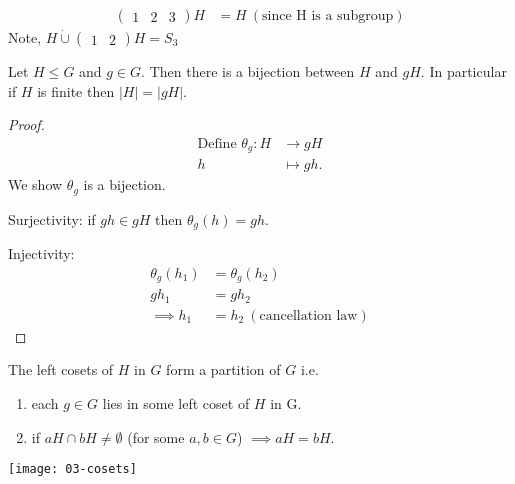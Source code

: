 \begin{example}
\begin{align*}
    \begin{pmatrix}1 & 2 & 3\end{pmatrix}H &= H \ (\text{since H is a subgroup})
\end{align*}
Note, $H \mathbin{\dot{\cup}} \begin{pmatrix}1 & 2\end{pmatrix}H = S_3$
\end{example}

\begin{lemma}
\protect\hypertarget{lem:nine}{}\label{lem:nine}Let $H \leq G$ and $g \in G$.
Then there is a bijection between $H$ and $gH$.
In particular if $H$ is finite then $|H| = |gH|$.
\end{lemma}

\begin{proof}
\begin{align*}
    \text{Define } \theta_g : H &\to gH \\
    h &\mapsto gh.
\end{align*}
We show $\theta_g$ is a bijection.

Surjectivity: if $gh \in gH$ then $\theta_g(h) = gh$.

Injectivity: \begin{align*}
    \theta_g(h_1) &= \theta_g(h_2) \\
    g h_1 &= g h_2 \\
    \implies h_1 &= h_2 \ (\text{cancellation law})
\end{align*}
\end{proof}

\begin{lemma}
\protect\hypertarget{lem:ten}{}\label{lem:ten}

    The left cosets of $H$ in $G$ form a partition of $G$ i.e.

    \begin{enumerate}
    \def\labelenumi{\roman{enumi}.}
    \item
    each $g \in G$ lies in some left coset of $H$ in G.
    \item
    if $aH \cap bH \neq \emptyset$ (for some $a, b \in G$) $\implies aH = bH$.
    \end{enumerate}

    {\centering \texttt{[image: 03-cosets]} }
\end{lemma}

